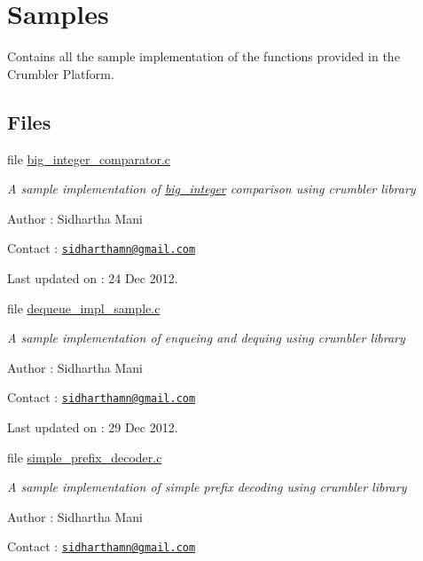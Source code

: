 \hypertarget{group__samples}{\section{Samples}
\label{group__samples}
}


Contains all the sample implementation of the functions provided in the Crumbler Platform.  


\subsection*{Files}
\begin{DoxyCompactItemize}
\item 
file \hyperlink{big__integer__comparator_8c}{big\-\_\-integer\-\_\-comparator.\-c}
\begin{DoxyCompactList}\small\item\em A sample implementation of \hyperlink{big__integer__impl_8h_structbig__integer}{big\-\_\-integer} comparison using crumbler library \par
 Author \-: Sidhartha Mani \par
 Contact \-: \href{mailto:sidharthamn@gmail.com}{\tt sidharthamn@gmail.\-com} \par
 Last updated on \-: 24 Dec 2012. \end{DoxyCompactList}\item 
file \hyperlink{dequeue__impl__sample_8c}{dequeue\-\_\-impl\-\_\-sample.\-c}
\begin{DoxyCompactList}\small\item\em A sample implementation of enqueing and dequing using crumbler library \par
 Author \-: Sidhartha Mani \par
 Contact \-: \href{mailto:sidharthamn@gmail.com}{\tt sidharthamn@gmail.\-com} \par
 Last updated on \-: 29 Dec 2012. \end{DoxyCompactList}\item 
file \hyperlink{simple__prefix__decoder_8c}{simple\-\_\-prefix\-\_\-decoder.\-c}
\begin{DoxyCompactList}\small\item\em A sample implementation of simple prefix decoding using crumbler library \par
 Author \-: Sidhartha Mani \par
 Contact \-: \href{mailto:sidharthamn@gmail.com}{\tt sidharthamn@gmail.\-com} \par

\end{DoxyCompactList}
\end{DoxyCompactItemize}
